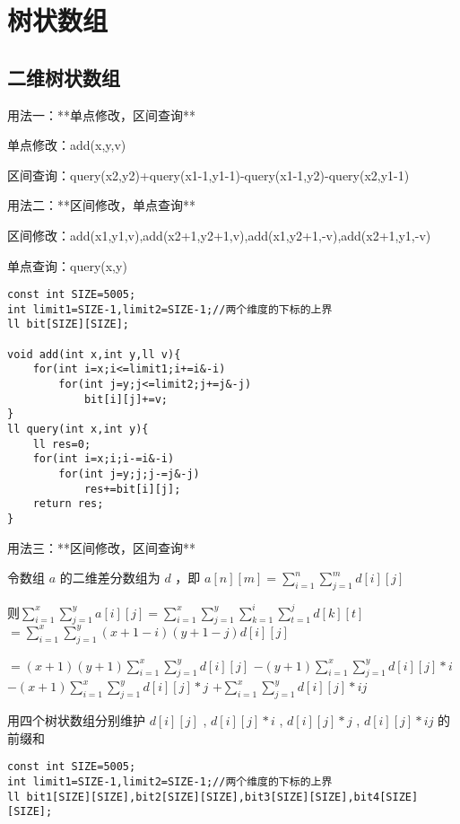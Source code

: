 \documentclass[12pt]{article}
\begin{document}
{{{{{{\section{树状数组}

\subsection{二维树状数组}

用法一：**单点修改，区间查询**

单点修改：add(x,y,v)

区间查询：query(x2,y2)+query(x1-1,y1-1)-query(x1-1,y2)-query(x2,y1-1)

用法二：**区间修改，单点查询**

区间修改：add(x1,y1,v),add(x2+1,y2+1,v),add(x1,y2+1,-v),add(x2+1,y1,-v)

单点查询：query(x,y)

{\setmainfont{Consolas}
\begin{lstlisting}
const int SIZE=5005;
int limit1=SIZE-1,limit2=SIZE-1;//两个维度的下标的上界
ll bit[SIZE][SIZE];

void add(int x,int y,ll v){
	for(int i=x;i<=limit1;i+=i&-i)
		for(int j=y;j<=limit2;j+=j&-j)
			bit[i][j]+=v;
}
ll query(int x,int y){
	ll res=0;
	for(int i=x;i;i-=i&-i)
		for(int j=y;j;j-=j&-j)
			res+=bit[i][j];
	return res;
}
\end{lstlisting}

用法三：**区间修改，区间查询**

令数组 $a$ 的二维差分数组为 $d$ ，即 $a[n][m]=\sum\limits_{i=1}^{n}\sum\limits_{j=1}^{m}{d[i][j]}$

则$\sum\limits_{i=1}^{x}\sum\limits_{j=1}^{y}{a[i][j]}=\sum\limits_{i=1}^{x}\sum\limits_{j=1}^{y}\sum\limits_{k=1}^{i}\sum\limits_{t=1}^{j}{d[k][t]}$  $=\sum\limits_{i=1}^{x}\sum\limits_{j=1}^{y}{(x+1-i)(y+1-j)d[i][j]}$ 

$=(x+1)(y+1)\sum\limits_{i=1}^{x}\sum\limits_{j=1}^{y}{d[i][j]}$ $-(y+1)\sum\limits_{i=1}^{x}\sum\limits_{j=1}^{y}{d[i][j]*i}$ $-(x+1)\sum\limits_{i=1}^{x}\sum\limits_{j=1}^{y}{d[i][j]*j}$ $+\sum\limits_{i=1}^{x}\sum\limits_{j=1}^{y}{d[i][j]*ij}$ 

用四个树状数组分别维护  $d[i][j]$  ,  $d[i][j]*i$  ,  $d[i][j]*j$  ,  $d[i][j]*ij$  的前缀和

{\setmainfont{Consolas}
\begin{lstlisting}
const int SIZE=5005;
int limit1=SIZE-1,limit2=SIZE-1;//两个维度的下标的上界
ll bit1[SIZE][SIZE],bit2[SIZE][SIZE],bit3[SIZE][SIZE],bit4[SIZE][SIZE];


\end{lstlisting}}}}}}}}}
\end{document}
